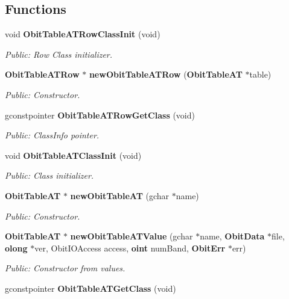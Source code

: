 \subsection*{Functions}
\begin{CompactItemize}
\item 
void {\bf Obit\-Table\-ATRow\-Class\-Init} (void)
\begin{CompactList}\small\item\em Public: Row Class initializer. \item\end{CompactList}\item 
{\bf Obit\-Table\-ATRow} $\ast$ {\bf new\-Obit\-Table\-ATRow} ({\bf Obit\-Table\-AT} $\ast$table)
\begin{CompactList}\small\item\em Public: Constructor. \item\end{CompactList}\item 
gconstpointer {\bf Obit\-Table\-ATRow\-Get\-Class} (void)
\begin{CompactList}\small\item\em Public: Class\-Info pointer. \item\end{CompactList}\item 
void {\bf Obit\-Table\-ATClass\-Init} (void)
\begin{CompactList}\small\item\em Public: Class initializer. \item\end{CompactList}\item 
{\bf Obit\-Table\-AT} $\ast$ {\bf new\-Obit\-Table\-AT} (gchar $\ast$name)
\begin{CompactList}\small\item\em Public: Constructor. \item\end{CompactList}\item 
{\bf Obit\-Table\-AT} $\ast$ {\bf new\-Obit\-Table\-ATValue} (gchar $\ast$name, {\bf Obit\-Data} $\ast$file, {\bf olong} $\ast$ver, Obit\-IOAccess access, {\bf oint} num\-Band, {\bf Obit\-Err} $\ast$err)
\begin{CompactList}\small\item\em Public: Constructor from values. \item\end{CompactList}\item 
gconstpointer {\bf Obit\-Table\-ATGet\-Class} (void)

\end{CompactItemize}
